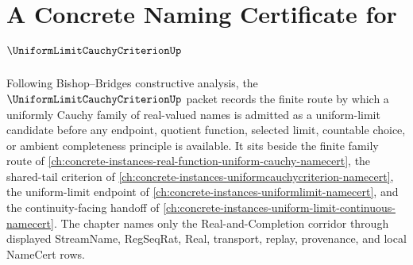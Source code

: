 \chapter{A Concrete Naming Certificate for $\UniformLimitCauchyCriterionUp$}
\label{ch:concrete-instances-uniform-limit-cauchy-criterion-namecert}

Following Bishop--Bridges constructive analysis, the $\UniformLimitCauchyCriterionUp$ packet records the finite route by which a uniformly Cauchy family of real-valued names is admitted as a uniform-limit candidate before any endpoint, quotient function, selected limit, countable choice, or ambient completeness principle is available. It sits beside the finite family route of \autoref{ch:concrete-instances-real-function-uniform-cauchy-namecert}, the shared-tail criterion of \autoref{ch:concrete-instances-uniformcauchycriterion-namecert}, the uniform-limit endpoint of \autoref{ch:concrete-instances-uniformlimit-namecert}, and the continuity-facing handoff of \autoref{ch:concrete-instances-uniform-limit-continuous-namecert}. The chapter names only the Real-and-Completion corridor through displayed StreamName, RegSeqRat, Real, transport, replay, provenance, and local NameCert rows.

